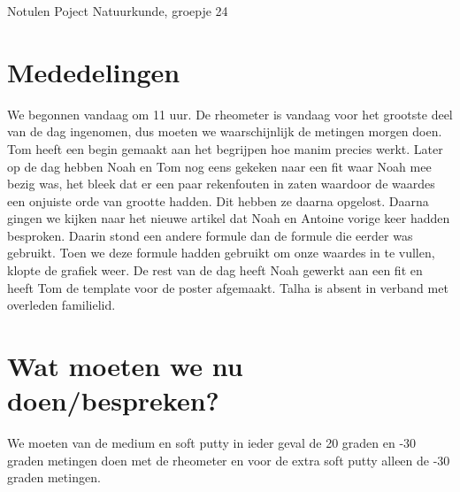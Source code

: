 \documentclass[11pt,a4paper]{article}
\begin{document}
\begin{Minutes}{Notulen Poject Natuurkunde, groepje 24}


\endtime{}
\location{}




\maketitle



\newpage


\section{Mededelingen} 
We begonnen vandaag om 11 uur. De rheometer is vandaag voor het grootste deel van de dag ingenomen, dus moeten we waarschijnlijk de metingen morgen doen. Tom heeft een begin gemaakt aan het begrijpen hoe manim precies werkt. Later op de dag hebben Noah en Tom nog eens gekeken naar een fit waar Noah mee bezig was, het bleek dat er een paar rekenfouten in zaten waardoor de waardes een onjuiste orde van grootte hadden. Dit hebben ze daarna opgelost. Daarna gingen we kijken naar het nieuwe artikel dat Noah en Antoine vorige keer hadden besproken. Daarin stond een andere formule dan de formule die eerder was gebruikt. Toen we deze formule hadden gebruikt om onze waardes in te vullen, klopte de grafiek weer. De rest van de dag heeft Noah gewerkt aan een fit en heeft Tom de template voor de poster afgemaakt. Talha is absent in verband met overleden familielid.


\section{Wat moeten we nu doen/bespreken?}
We moeten van de medium en soft putty in ieder geval de 20 graden en -30 graden metingen doen met de rheometer en voor de extra soft putty alleen de -30 graden metingen.


\end{Minutes}
\end{document}
